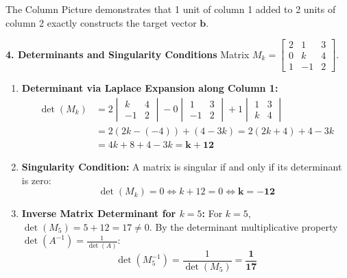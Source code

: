 \begin{enumerate}
\begin{equation*}
    \end{equation*}
    The Column Picture demonstrates that 1 unit of column 1 added to 2 units of column 2 exactly constructs the target vector $\mathbf{b}$.
\end{enumerate}

\textbf{4. Determinants and Singularity Conditions}
Matrix $M_k = \begin{bmatrix} 2 & 1 & 3 \\ 0 & k & 4 \\ 1 & -1 & 2 \end{bmatrix}$.
\begin{enumerate}
    \item \textbf{Determinant via Laplace Expansion along Column 1:}
    \begin{align*}
    \det(M_k) &= 2 \begin{vmatrix} k & 4 \\ -1 & 2 \end{vmatrix} - 0 \begin{vmatrix} 1 & 3 \\ -1 & 2 \end{vmatrix} + 1 \begin{vmatrix} 1 & 3 \\ k & 4 \end{vmatrix} \\
    &= 2(2k - (-4)) + (4 - 3k) = 2(2k + 4) + 4 - 3k \\
    &= 4k + 8 + 4 - 3k = \mathbf{k + 12}
    \end{align*}
    \item \textbf{Singularity Condition:}
    A matrix is singular if and only if its determinant is zero:
    \begin{equation*}
    \det(M_k) = 0 \iff k + 12 = 0 \iff \mathbf{k = -12}
    \end{equation*}
    \item \textbf{Inverse Matrix Determinant for $k = 5$:}
    For $k = 5$, $\det(M_5) = 5 + 12 = 17 \neq 0$.
    By the determinant multiplicative property $\det(A^{-1}) = \frac{1}{\det(A)}$:
    \begin{equation*}
    \det(M_5^{-1}) = \frac{1}{\det(M_5)} = \mathbf{\frac{1}{17}}
    \end{equation*}
\end{enumerate}

